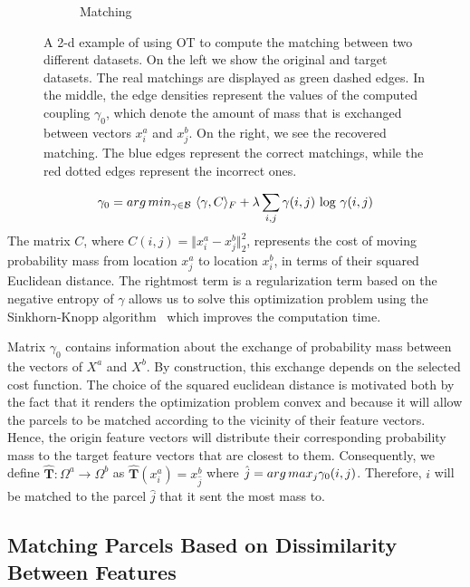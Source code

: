 \begin{figure}[t!]
\begin{subfigure}[t]{0.32\textwidth}
        \caption{{\scriptsize Matching}}
        \label{fig:otprob_c}
    \end{subfigure}
    \caption{{\footnotesize A 2-d example of using OT to compute the matching between two different datasets. On the left we show the original and target datasets. The real matchings are displayed as green dashed edges. In the middle, the edge densities represent the values of the computed coupling $\gamma_0$, which denote the amount of mass that is exchanged between vectors $x_i^a$ and $x_j^b$. On the right, we see the recovered matching. The blue edges represent the correct matchings, while the red dotted edges represent the incorrect ones.}}
    \label{fig:otprob}
\end{figure}

\begin{equation}
\gamma_0 = arg\,min_{\gamma \in \mathcal{B}} \textnormal{~} \langle \gamma,C \rangle_F + \lambda \sum_{i,j} \gamma(i,j) \textnormal{~log~} \gamma(i,j)
\end{equation}
The matrix $C$, where $C(i,j) = \Vert x^a_i - x^b_j \Vert^2_2$, represents the cost of moving probability mass from location $x^a_j$ to location $x^b_i$, in terms of their squared Euclidean distance. The rightmost term is a regularization term based on the negative entropy of $\gamma$ allows us to solve this optimization problem using the Sinkhorn-Knopp algorithm~\cite{cuturi_sh} which improves the computation time.

Matrix $\gamma_0$ contains information about the exchange of probability mass between the vectors of $X^a$ and $X^b$. By construction, this exchange depends on the selected cost function. The choice of the squared euclidean distance is motivated both by the fact that it renders the optimization problem convex and because it will allow the parcels to be matched according to the vicinity of their feature vectors. Hence, the origin feature vectors will distribute their corresponding probability mass to the target feature vectors that are closest to them. Consequently, we define $\hat{\mathbf{T}}:\Omega^a \rightarrow \Omega^b$ as $\hat{\mathbf{T}}(x^a_i) = x^b_{\hat{j}}$ where $\hat{j} = arg\,max_{j} \gamma_0(i,j)$. Therefore, $i$ will be matched to the parcel $\hat{j}$ that it sent the most mass to.

\subsection{Matching Parcels Based on Dissimilarity Between Features}
\label{sec:others}


